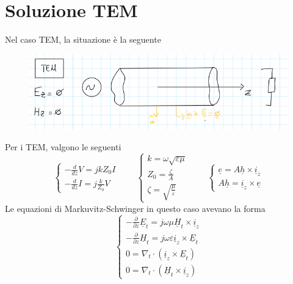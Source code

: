 \documentclass{book}
\begin{document}
    \section{Soluzione TEM}
        Nel caso TEM, la situazione è la seguente
        \begin{figure}[h!]
            \center  
            \includegraphics[width=0.6\linewidth]{img/Chapter_three/Chapt3img3.png}
        \end{figure}
        \newpage 
        Per i TEM, valgono le seguenti
        \begin{equation}
            \begin{cases}
                \displaystyle -\frac{d}{dz}V = jkZ_{0}I \\
                \displaystyle -\frac{d}{dz}I = j \frac{k}{Z_{0}} V
            \end{cases} \qquad 
            \begin{cases}
                k = \omega \sqrt{\varepsilon \mu} \\
                \displaystyle Z_{0} = \frac{\zeta}{A} \\
                \displaystyle \zeta = \sqrt{\frac{\mu}{\varepsilon}}
            \end{cases} \qquad 
            \begin{cases}
                \underline{e} = A \underline{h} \times \underline{i}_{z} \\
                A \underline{h} = \underline{i}_{z} \times \underline{e}
            \end{cases}
        \end{equation}
        Le equazioni di Markuvitz-Schwinger in questo caso avevano la forma
        \begin{equation}
            \begin{cases}
            \displaystyle -\frac{\partial}{\partial z}\underline{E}_{t} = j \omega \mu \underline{H}_{t} \times \underline{i}_{z} \\
            \displaystyle -\frac{\partial}{\partial z}\underline{H}_{t} = j \omega \varepsilon \underline{i}_{z} \times \underline{E}_{t} \\
            0 = \nabla_{t} \cdot (\underline{i}_{z} \times \underline{E}_{t}) \\
            0 = \nabla_{t} \cdot (\underline{H}_{t}\times \underline{i}_{z})
            \end{cases}
        \end{equation}
\end{document}

